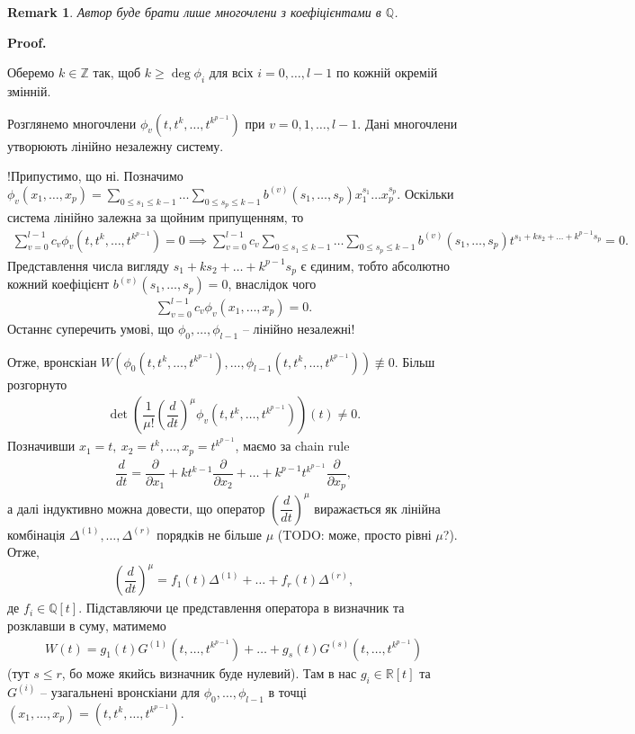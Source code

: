 \documentclass[a4paper, 10pt]{article}
\makeatletter
\theoremstyle{theoremdd}
\theoremstyle{theoremdd}
\theoremstyle{theoremdd}
\theoremstyle{theoremdd}
\theoremstyle{theoremdd}
\theoremstyle{theoremdd}
\theoremstyle{theoremdd}
\theoremstyle{theoremdd}
\theoremstyle{theoremdd}
\theoremstyle{theoremdd}
\theoremstyle{theoremdd}
\newtheorem{remark}[theorem]{Remark}
\theoremstyle{theoremdd}
\theoremstyle{theoremdd}
\theoremstyle{theoremdd}
\theoremstyle{theoremdd}
\renewenvironment{proof}[1][Proof.\\]{\par
\pushQED{\hfill \qed}%
\normalfont \topsep6\p@\@plus6\p@\relax
\trivlist
\item\relax
{\bfseries
#1\@addpunct{.}}\hspace\labelsep\ignorespaces
}{%
\popQED\endtrivlist\@endpefalse
}
\makeatother
\begin{document}
\begin{remark}
Автор буде брати лише многочлени з коефіцієнтами в $\mathbb{Q}$.
\end{remark}

\begin{proof}
Оберемо $k \in \mathbb{Z}$ так, щоб $k \geq \deg \phi_i$ для всіх $i = 0,\dots,l-1$ по кожній окремій змінній.

Розглянемо многочлени $\phi_v(t,t^k,\dots,t^{k^{p-1}})$ при $v = 0,1,\dots,l-1$. Дані многочлени утворюють лінійно незалежну систему.

!Припустимо, що ні. Позначимо $\phi_v(x_1,\dots,x_p) = \displaystyle\sum_{0 \leq s_1 \leq k-1} \dots \sum_{0 \leq s_p \leq k-1} b^{(v)}(s_1,\dots,s_p) x_1^{s_1} \dots x_p^{s_p}$. Оскільки система лінійно залежна за щойним припущенням, то 
\begin{align*}
\sum_{v=0}^{l-1} c_v \phi_v(t,t^k,\dots,t^{k^{p-1}}) = 0 \implies \sum_{v=0}^{l-1} c_v\sum_{0 \leq s_1 \leq k-1} \dots \sum_{0 \leq s_p \leq k-1} b^{(v)}(s_1,\dots,s_p) t^{s_1+ks_2+\dots+k^{p-1}s_p} = 0.
\end{align*}
Представлення числа вигляду $s_1 + ks_2 + \dots + k^{p-1} s_p$ є єдиним, тобто абсолютно кожний коефіцієнт $b^{(v)}(s_1,\dots,s_p) = 0$, внаслідок чого
\begin{align*}
\sum_{v=0}^{l-1} c_v \phi_v(x_1,\dots,x_p) = 0.
\end{align*}
Останнє суперечить умові, що $\phi_0,\dots,\phi_{l-1}$ -- лінійно незалежні!

Отже, вронскіан $W(\phi_0(t,t^k,\dots,t^{k^{p-1}}),\dots,\phi_{l-1}(t,t^k,\dots,t^{k^{p-1}})) \not\equiv 0$. Більш розгорнуто
\begin{align*}
\det \left( \dfrac{1}{\mu !} \left( \dfrac{d}{dt} \right)^\mu \phi_v(t,t^k,\dots,t^{k^{p-1}}) \right) (t) \neq 0.
\end{align*}
Позначивши $x_1 = t,\ x_2 = t^k,\dots, x_p = t^{k^{p-1}}$, маємо за chain rule
\begin{align*}
\dfrac{d}{dt} = \dfrac{\partial}{\partial x_1} + kt^{k-1} \dfrac{\partial}{\partial x_2} + \dots + k^{p-1} t^{k^{p-1}} \dfrac{\partial}{\partial x_p},
\end{align*}
а далі індуктивно можна довести, що оператор $\left( \dfrac{d}{dt} \right)^\mu$ виражається як лінійна комбінація $\Delta^{(1)},\dots,\Delta^{(r)}$ порядків не більше $\mu$ (TODO: може, просто рівні $\mu$?). Отже,
\begin{align*}
\left( \dfrac{d}{dt} \right)^\mu = f_1(t) \Delta^{(1)} + \dots + f_r(t) \Delta^{(r)},
\end{align*}
де $f_i \in \mathbb{Q}[t]$. Підставляючи це представлення оператора в визначник та розклавши в суму, матимемо
\begin{align*}
W(t) = g_1(t) G^{(1)}(t,\dots,t^{k^{p-1}}) + \dots + g_s(t) G^{(s)}(t,\dots,t^{k^{p-1}})
\end{align*}
(тут $s \leq r$, бо може якийсь визначник буде нулевий). Там в нас $g_i \in \mathbb{R}[t]$ та $G^{(i)}$ -- узагальнені вронскіани для $\phi_0,\dots,\phi_{l-1}$ в точці $(x_1,\dots,x_p) = (t,t^k,\dots,t^{k^{p-1}})$.


\end{proof}
\end{document}
